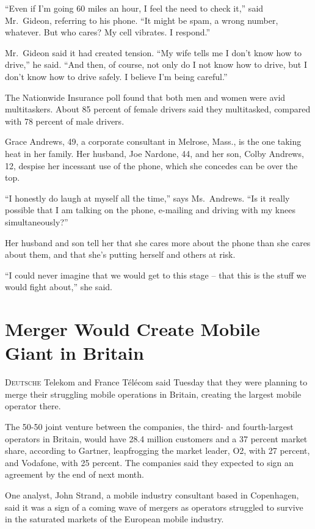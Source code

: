 ﻿\documentclass[12pt]{article}
\begin{document}
``Even if I'm going 60 miles an hour, I feel the need to check it,'' said Mr.~Gideon, referring to
his phone. ``It might be spam, a wrong number, whatever. But who cares? My cell vibrates. I
respond.''

Mr.~Gideon said it had created tension. ``My wife tells me I don't know how to drive,'' he said.
``And then, of course, not only do I not know how to drive, but I don't know how to drive safely. I
believe I'm being careful.''

The Nationwide Insurance poll found that both men and women were avid multitaskers. About 85 percent
of female drivers said they multitasked, compared with 78 percent of male drivers.

Grace Andrews, 49, a corporate consultant in Melrose, Mass., is the one taking heat in her family.
Her husband, Joe Nardone, 44, and her son, Colby Andrews, 12, despise her incessant use of the
phone, which she concedes can be over the top.

``I honestly do laugh at myself all the time,'' says Ms.~Andrews. ``Is it really possible that I am
talking on the phone, e-mailing and driving with my knees simultaneously?''

Her husband and son tell her that she cares more about the phone than she cares about them, and that
she's putting herself and others at risk.

``I could never imagine that we would get to this stage -- that this is the stuff we would fight
about,'' she said.

\section{Merger Would Create Mobile Giant in Britain}

\lettrine{D}{eutsche} Telekom and France T\'el\'ecom said Tuesday that they were planning to merge
their struggling mobile operations in Britain, creating the largest mobile operator there.

The 50-50 joint venture between the companies, the third- and fourth-largest operators in Britain,
would have 28.4 million customers and a 37 percent market share, according to Gartner, leapfrogging
the market leader, O2, with 27 percent, and Vodafone, with 25 percent. The companies said they
expected to sign an agreement by the end of next month.

One analyst, John Strand, a mobile industry consultant based in Copenhagen, said it was a sign of a
coming wave of mergers as operators struggled to survive in the saturated\cite{saturate} markets of
the European mobile industry.
\end{document}
